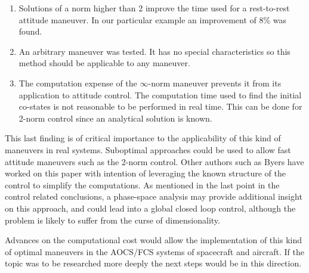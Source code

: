\begin{enumerate}
	\item Solutions of a norm higher than 2 improve the time used for a rest-to-rest attitude maneuver. In our particular example an improvement of 8\% was found.
	
	\item An arbitrary maneuver was tested. It has no special characteristics so this method should be applicable to any maneuver.
	
	\item The computation expense of the $\infty$-norm maneuver prevents it from its application to attitude control. The computation time used to find the initial co-states is not reasonable to be performed in real time. This can be done for 2-norm control since an analytical solution is known.
\end{enumerate}

This last finding is of critical importance to the applicability of this kind of maneuvers in real systems. Suboptimal approaches could be used to allow fast attitude maneuvers such as the 2-norm control. Other authors such as Byers\cite{byers1993quasi} have worked on this paper with intention of leveraging the known structure of the control to simplify the computations. As mentioned in the last point in the control related conclusions, a phase-space analysis may provide additional insight on this approach, and could lead into a global closed loop control, although the problem is likely to suffer from the curse of dimensionality.

Advances on the computational cost would allow the implementation of this kind of optimal maneuvers in the AOCS/FCS systems of spacecraft and aircraft. If the topic was to be researched more deeply the next steps would be in this direction.
